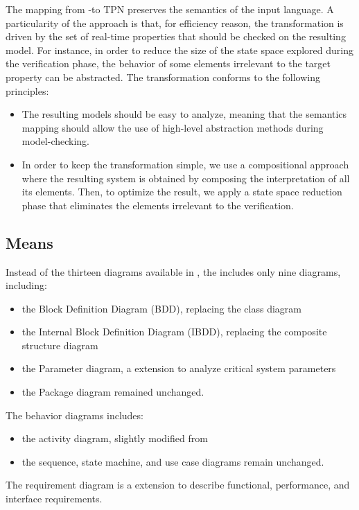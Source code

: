 The mapping from \uml-\marte to TPN preserves the semantics of the
input language. A particularity of the approach is that, for
efficiency reason, the transformation is driven by the set of
real-time properties that should be checked on the resulting
model. For instance, in order to reduce the size of the state space
explored during the verification phase, the behavior of some elements
irrelevant to the target property can be abstracted. The
transformation conforms to the following principles:
\begin{itemize}
\item The resulting \tpn models should be easy to analyze, meaning
  that the semantics mapping should allow the use of high-level
  abstraction methods during model-checking.
\item In order to keep the transformation simple, we use a
  compositional approach where the resulting system is obtained by
  composing the interpretation of all its elements. Then, to optimize
  the result, we apply a state space reduction phase that eliminates
  the elements irrelevant to the verification.
\end{itemize}


\subsection{Means}
Instead of the thirteen diagrams available in , the \sysml
includes only nine diagrams, including:
\begin{itemize}
\item
the Block Definition Diagram (BDD), replacing the  class diagram
\item
the Internal Block Definition Diagram (IBDD), replacing the  composite structure diagram
\item
the Parameter diagram, a \sysml extension to analyze critical system parameters
\item
the Package diagram remained unchanged. 
\end{itemize}

The behavior diagrams includes:
\begin{itemize}
\item
the activity diagram, slightly modified from 
\item
the sequence, state machine, and use case diagrams remain unchanged. 
\end{itemize}

The requirement diagram is a \sysml extension to describe functional, performance, and interface requirements.	

